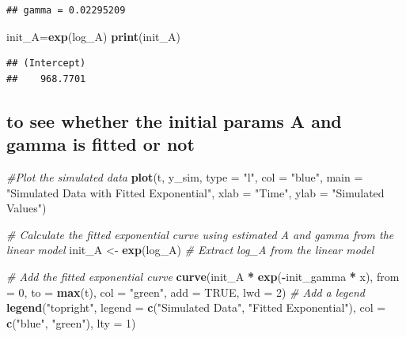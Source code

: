 \documentclass[
]{article}
\newenvironment{Shaded}{\begin{snugshade}}{\end{snugshade}}
\newcommand{\AttributeTok}[1]{\textcolor[rgb]{0.13,0.29,0.53}{#1}}
\newcommand{\CommentTok}[1]{\textcolor[rgb]{0.56,0.35,0.01}{\textit{#1}}}
\newcommand{\ConstantTok}[1]{\textcolor[rgb]{0.56,0.35,0.01}{#1}}
\newcommand{\DecValTok}[1]{\textcolor[rgb]{0.00,0.00,0.81}{#1}}
\newcommand{\FunctionTok}[1]{\textcolor[rgb]{0.13,0.29,0.53}{\textbf{#1}}}
\newcommand{\NormalTok}[1]{#1}
\newcommand{\OtherTok}[1]{\textcolor[rgb]{0.56,0.35,0.01}{#1}}
\newcommand{\SpecialCharTok}[1]{\textcolor[rgb]{0.81,0.36,0.00}{\textbf{#1}}}
\newcommand{\StringTok}[1]{\textcolor[rgb]{0.31,0.60,0.02}{#1}}
\begin{document}
\begin{verbatim}
## gamma = 0.02295209
\end{verbatim}

\begin{Shaded}
\begin{Highlighting}[]
\NormalTok{init\_A}\OtherTok{=}\FunctionTok{exp}\NormalTok{(log\_A)}
\FunctionTok{print}\NormalTok{(init\_A)}
\end{Highlighting}
\end{Shaded}

\begin{verbatim}
## (Intercept) 
##    968.7701
\end{verbatim}

\hypertarget{to-see-whether-the-initial-params-a-and-gamma-is-fitted-or-not}{%
\subsection{to see whether the initial params A and gamma is fitted or
not}\label{to-see-whether-the-initial-params-a-and-gamma-is-fitted-or-not}}

\begin{Shaded}
\begin{Highlighting}[]
\CommentTok{\#Plot the simulated data}
\FunctionTok{plot}\NormalTok{(t, y\_sim, }\AttributeTok{type =} \StringTok{"l"}\NormalTok{, }\AttributeTok{col =} \StringTok{"blue"}\NormalTok{, }\AttributeTok{main =} \StringTok{"Simulated Data with Fitted Exponential"}\NormalTok{, }\AttributeTok{xlab =} \StringTok{"Time"}\NormalTok{, }\AttributeTok{ylab =} \StringTok{"Simulated Values"}\NormalTok{)}

\CommentTok{\# Calculate the fitted exponential curve using estimated A and gamma from the linear model}
\NormalTok{init\_A }\OtherTok{\textless{}{-}} \FunctionTok{exp}\NormalTok{(log\_A)  }\CommentTok{\# Extract log\_A from the linear model}

\CommentTok{\# Add the fitted exponential curve}
\FunctionTok{curve}\NormalTok{(init\_A }\SpecialCharTok{*} \FunctionTok{exp}\NormalTok{(}\SpecialCharTok{{-}}\NormalTok{init\_gamma }\SpecialCharTok{*}\NormalTok{ x), }\AttributeTok{from =} \DecValTok{0}\NormalTok{, }\AttributeTok{to =} \FunctionTok{max}\NormalTok{(t), }\AttributeTok{col =} \StringTok{"green"}\NormalTok{, }\AttributeTok{add =} \ConstantTok{TRUE}\NormalTok{, }\AttributeTok{lwd =} \DecValTok{2}\NormalTok{)}
\CommentTok{\#  Add a legend }
\FunctionTok{legend}\NormalTok{(}\StringTok{"topright"}\NormalTok{, }\AttributeTok{legend =} \FunctionTok{c}\NormalTok{(}\StringTok{"Simulated Data"}\NormalTok{, }\StringTok{"Fitted Exponential"}\NormalTok{), }\AttributeTok{col =} \FunctionTok{c}\NormalTok{(}\StringTok{"blue"}\NormalTok{, }\StringTok{"green"}\NormalTok{), }\AttributeTok{lty =} \DecValTok{1}\NormalTok{)}
\end{Highlighting}
\end{Shaded}
\end{document}
